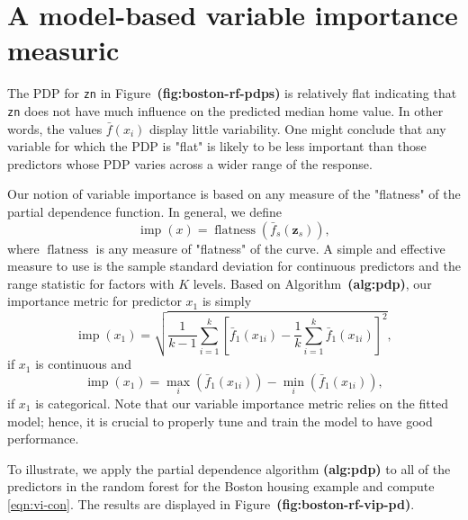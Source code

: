 \documentclass[12pt]{article}
\def\code#1{\texttt{#1}}
\def\ref#1{\textbf{(#1)}}
\DeclareMathOperator{\flatness}{flatness}
\DeclareMathOperator{\imp}{imp}
\begin{document}
\section{A model-based variable importance measuric}
\label{sec:new}

The PDP for \code{zn} in Figure~\ref{fig:boston-rf-pdps} is relatively flat indicating that \code{zn} does not have much influence on the predicted median home value. In other words, the values $\bar{f}\left(x_{i}\right)$ display little variability. One might conclude that any variable for which the PDP is "flat" is likely to be less important than those predictors whose PDP varies across a wider range of the response.

Our notion of variable importance is based on any measure of the "flatness" of the partial dependence function. In general, we define
\begin{equation}
  \imp\left(x\right) = \flatness\left(\bar{f}_s\left(\boldsymbol{z}_s\right)\right),
\end{equation}
where $\flatness$ is any measure of "flatness" of the curve. A simple and effective measure to use is the sample standard deviation for continuous predictors and the range statistic for factors with $K$ levels. Based on Algorithm~\ref{alg:pdp}, our importance metric for predictor $x_1$ is simply
\begin{equation}
\label{eqn:vi-con}
  \imp\left(x_1\right) = \sqrt{\frac{1}{k - 1}\sum_{i = 1}^k\left[\bar{f}_1\left(x_{1i}\right) - \frac{1}{k}\sum_{i = 1}^k\bar{f}_1\left(x_{1i}\right)\right] ^ 2},
\end{equation}
if $x_1$ is continuous and
\begin{equation}
\label{eqn:vi-fac}
  \imp\left(x_1\right) = \max_i\left(\bar{f}_1\left(x_{1i}\right)\right) - \min_i\left(\bar{f}_1\left(x_{1i}\right)\right),
\end{equation}
if $x_1$ is categorical. Note that our variable importance metric relies on the fitted model; hence, it is crucial to properly tune and train the model to have good performance.

To illustrate, we apply the partial dependence algorithm \ref{alg:pdp} to all of the predictors in the random forest for the Boston housing example and compute \eqref{eqn:vi-con}. The results are displayed in Figure~\ref{fig:boston-rf-vip-pd}.
\end{document}
